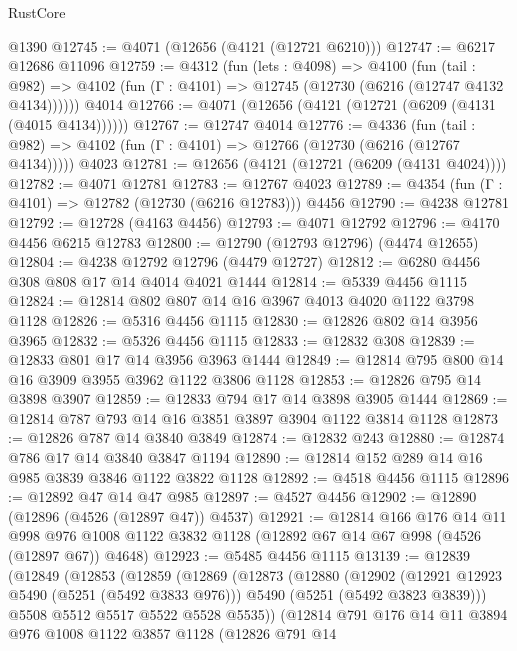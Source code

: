 \begin{lexlean}{RustCore}
\begin{coremodule}
    @1390
@12745 := @4071 (@12656 (@4121 (@12721 @6210)))
@12747 := @6217 @12686 @11096
@12759 := @4312
    (fun (lets : @4098) =>
    @4100
      (fun (tail : @982) =>
      @4102 (fun (Γ : @4101) => @12745 (@12730 (@6216 (@12747 @4132 @4134))))))
    @4014
@12766 := @4071 (@12656 (@4121 (@12721 (@6209 (@4131 (@4015 @4134))))))
@12767 := @12747 @4014
@12776 := @4336
    (fun (tail : @982) => @4102 (fun (Γ : @4101) => @12766 (@12730 (@6216 (@12767 @4134)))))
    @4023
@12781 := @12656 (@4121 (@12721 (@6209 (@4131 @4024))))
@12782 := @4071 @12781
@12783 := @12767 @4023
@12789 := @4354 (fun (Γ : @4101) => @12782 (@12730 (@6216 @12783))) @4456
@12790 := @4238 @12781
@12792 := @12728 (@4163 @4456)
@12793 := @4071 @12792
@12796 := @4170 @4456 @6215 @12783
@12800 := @12790 (@12793 @12796) (@4474 @12655)
@12804 := @4238 @12792 @12796 (@4479 @12727)
@12812 := @6280 @4456 @308 @808 @17 @14 @4014 @4021 @1444
@12814 := @5339 @4456 @1115
@12824 := @12814 @802 @807 @14 @16 @3967 @4013 @4020 @1122 @3798 @1128
@12826 := @5316 @4456 @1115
@12830 := @12826 @802 @14 @3956 @3965
@12832 := @5326 @4456 @1115
@12833 := @12832 @308
@12839 := @12833 @801 @17 @14 @3956 @3963 @1444
@12849 := @12814 @795 @800 @14 @16 @3909 @3955 @3962 @1122 @3806 @1128
@12853 := @12826 @795 @14 @3898 @3907
@12859 := @12833 @794 @17 @14 @3898 @3905 @1444
@12869 := @12814 @787 @793 @14 @16 @3851 @3897 @3904 @1122 @3814 @1128
@12873 := @12826 @787 @14 @3840 @3849
@12874 := @12832 @243
@12880 := @12874 @786 @17 @14 @3840 @3847 @1194
@12890 := @12814 @152 @289 @14 @16 @985 @3839 @3846 @1122 @3822 @1128
@12892 := @4518 @4456 @1115
@12896 := @12892 @47 @14 @47 @985
@12897 := @4527 @4456
@12902 := @12890 (@12896 (@4526 (@12897 @47)) @4537)
@12921 := @12814
    @166
    @176
    @14
    @11
    @998
    @976
    @1008
    @1122
    @3832
    @1128
    (@12892 @67 @14 @67 @998 (@4526 (@12897 @67)) @4648)
@12923 := @5485 @4456 @1115
@13139 := @12839
    (@12849
      (@12853
        (@12859
          (@12869
            (@12873
              (@12880
                (@12902
                  (@12921 @12923 @5490 (@5251 (@5492 @3833 @976)))
                  @5490
                  (@5251 (@5492 @3823 @3839)))
                @5508
                @5512
                @5517
                @5522
                @5528
                @5535))
            (@12814
              @791
              @176
              @14
              @11
              @3894
              @976
              @1008
              @1122
              @3857
              @1128
              (@12826
                @791
                @14

\end{coremodule}
\end{lexlean}
